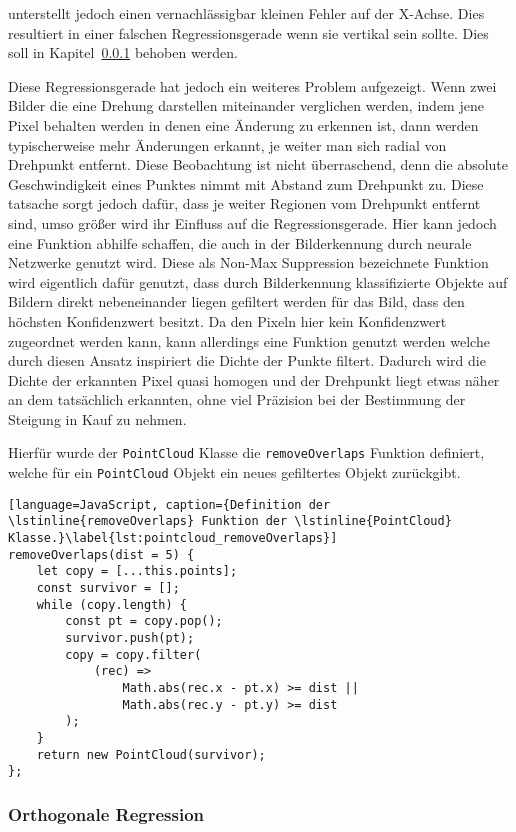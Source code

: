 unterstellt jedoch einen vernachlässigbar kleinen Fehler auf der X-Achse.
Dies resultiert in einer falschen Regressionsgerade wenn sie vertikal sein sollte.
Dies soll in Kapitel~\ref{ch:orthogonale_regression} behoben werden.

Diese Regressionsgerade hat jedoch ein weiteres Problem aufgezeigt.
Wenn zwei Bilder die eine Drehung darstellen miteinander verglichen werden, indem jene Pixel behalten werden in denen eine Änderung zu erkennen ist, dann werden typischerweise mehr Änderungen erkannt, je weiter man sich radial von Drehpunkt entfernt.
Diese Beobachtung ist nicht überraschend, denn die absolute Geschwindigkeit eines Punktes nimmt mit Abstand zum Drehpunkt zu.
Diese tatsache sorgt jedoch dafür, dass je weiter Regionen vom Drehpunkt entfernt sind, umso größer wird ihr Einfluss auf die Regressionsgerade.
Hier kann jedoch eine Funktion abhilfe schaffen, die auch in der Bilderkennung durch neurale Netzwerke genutzt wird.
Diese als Non-Max Suppression %
bezeichnete Funktion wird eigentlich dafür genutzt, dass durch Bilderkennung klassifizierte Objekte auf Bildern direkt nebeneinander liegen gefiltert werden für das Bild, dass den höchsten Konfidenzwert besitzt.
Da den Pixeln hier kein Konfidenzwert zugeordnet werden kann, kann allerdings eine Funktion genutzt werden welche durch diesen Ansatz inspiriert die Dichte der Punkte filtert.
Dadurch wird die Dichte der erkannten Pixel quasi homogen und der Drehpunkt liegt etwas näher an dem tatsächlich erkannten, ohne viel Präzision bei der Bestimmung der Steigung in Kauf zu nehmen.

Hierfür wurde der \lstinline{PointCloud} Klasse die \lstinline{removeOverlaps} Funktion definiert, welche für ein \lstinline{PointCloud} Objekt ein neues gefiltertes Objekt zurückgibt.

\begin{lstlisting}[language=JavaScript, caption={Definition der \lstinline{removeOverlaps} Funktion der \lstinline{PointCloud} Klasse.}\label{lst:pointcloud_removeOverlaps}]
removeOverlaps(dist = 5) {
    let copy = [...this.points];
    const survivor = [];
    while (copy.length) {
        const pt = copy.pop();
        survivor.push(pt);
        copy = copy.filter(
            (rec) =>
                Math.abs(rec.x - pt.x) >= dist ||
                Math.abs(rec.y - pt.y) >= dist
        );
    }
    return new PointCloud(survivor);
};
\end{lstlisting}

\subsubsection{Orthogonale Regression}\label{ch:orthogonale_regression}

